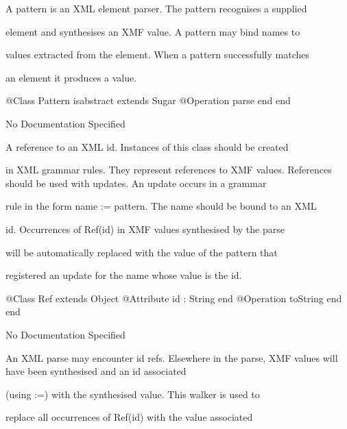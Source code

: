       A pattern is an XML element parser. The pattern recognises a supplied

      element and synthesises an XMF value. A pattern may bind names to

      values extracted from the element. When a pattern successfully matches

      an element it produces a value.
\begin{Interface}
@Class Pattern isabstract extends Sugar
  @Operation parse end
end
\end{Interface}
No Documentation Specified

      A reference to an XML id. Instances of this class should be created

      in XML grammar rules. They represent references to XMF values. 
      References should be used with updates. An update occurs in a grammar

      rule in the form name := pattern. The name should be bound to an XML

      id. Occurrences of Ref(id) in XMF values synthesised by the parse

      will be automatically replaced with the value of the pattern that

      registered an update for the name whose value is the id.
\begin{Interface}
@Class Ref extends Object
  @Attribute id : String end
  @Operation toString end
end
\end{Interface}
No Documentation Specified

      An XML parse may encounter id refs. Elsewhere in the parse,
      XMF values will have been synthesised and an id associated

      (using :=) with the synthesised value. This walker is used to

      replace all occurrences of Ref(id) with the value associated

